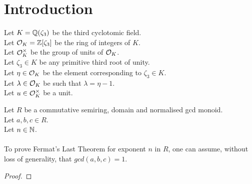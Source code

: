 \chapter{Introduction}


Let $K = \mathbb{Q}(\zeta_3)$ be the third cyclotomic field. \\%
Let $\mathcal{O}_K = \mathbb{Z}[\zeta_3]$ be the ring of integers of $K$. \\
Let $\mathcal{O}^\times_K$ be the group of units of $\mathcal{O}_K$. \\
Let $\zeta_3 \in K$ be any primitive third root of unity. \\ %
Let $\eta \in \mathcal{O}_K$ be the element corresponding to $\zeta_3 \in K$. \\
Let $\lambda \in \mathcal{O}_K$ be such that $\lambda = \eta -1$. \\
Let $u \in \mathcal{O}^\times_K$ be a unit.

\begin{lemma}
    \label{lmm:fermatLastTheoremWith_of_fermatLastTheoremWith_coprime}
    \leanok
    Let $R$ be a commutative semiring, domain and normalised gcd monoid.\\%
    Let $a, b, c \in R$. \\
    Let $n \in \mathbb{N}$. \\\\
    To prove Fermat's Last Theorem for exponent $n$ in $R$,
    one can assume, without loss of generality, that $gcd(a,b,c)=1$.
\end{lemma}
\begin{proof}
    \leanok
\end{proof}

